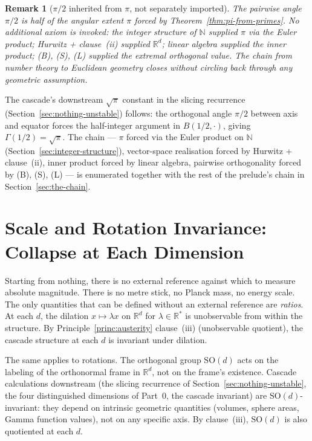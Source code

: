 \documentclass[11pt,a4paper]{article}
\newtheorem{remark}[theorem]{Remark}
\begin{document}
\begin{remark}[$\pi/2$ inherited from $\pi$, not separately imported]
The pairwise angle $\pi/2$ is half of the angular extent $\pi$
forced by Theorem~\ref{thm:pi-from-primes}. No additional axiom is
invoked: the integer structure of $\mathbb{N}$ supplied $\pi$ via
the Euler product; Hurwitz + clause~(ii) supplied $\mathbb{R}^d$;
linear algebra supplied the inner product; (B), (S), (L) supplied
the extremal orthogonal value. The chain from number theory to
Euclidean geometry closes without circling back through any
geometric assumption.
\end{remark}

\medskip

\noindent The cascade's downstream $\sqrt{\pi}$ constant in the
slicing recurrence (Section~\ref{sec:nothing-unstable}) follows: the
orthogonal angle $\pi/2$ between axis and equator forces the
half-integer argument in $B(1/2,\cdot)$, giving $\Gamma(1/2) =
\sqrt{\pi}$. The chain --- $\pi$ forced via the Euler product on
$\mathbb{N}$ (Section~\ref{sec:integer-structure}), vector-space
realisation forced by Hurwitz + clause~(ii), inner product forced by
linear algebra, pairwise orthogonality forced by (B), (S), (L) ---
is enumerated together with the rest of the prelude's chain in
Section~\ref{sec:the-chain}.

\section{Scale and Rotation Invariance: Collapse at Each Dimension}\label{sec:scale-and-rotation-invariance-collapse-a}

Starting from nothing, there is no external reference against which to
measure absolute magnitude. There is no metre stick, no Planck mass,
no energy scale. The only quantities that can be defined without an
external reference are \emph{ratios}. At each $d$, the dilation
$x\mapsto\lambda x$ on $\mathbb{R}^d$ for $\lambda\in\mathbb{R}^{*}$
is unobservable from within the structure. By
Principle~\ref{princ:austerity} clause~(iii) (unobservable quotient),
the cascade structure at each $d$ is invariant under dilation.

The same applies to rotations. The orthogonal group $\mathrm{SO}(d)$
acts on the labeling of the orthonormal frame in $\mathbb{R}^d$, not
on the frame's existence. Cascade calculations downstream (the slicing
recurrence of Section~\ref{sec:nothing-unstable}, the four
distinguished dimensions of Part~0, the cascade invariant) are
$\mathrm{SO}(d)$-invariant: they depend on intrinsic geometric
quantities (volumes, sphere areas, Gamma function values), not on any
specific axis. By clause~(iii), $\mathrm{SO}(d)$ is also quotiented at
each $d$.
\end{document}
